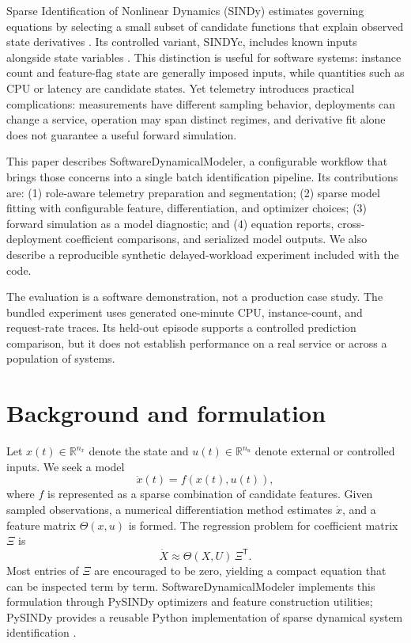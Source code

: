 \documentclass[11pt]{article}
\begin{document}
Sparse Identification of Nonlinear Dynamics (SINDy) estimates governing equations by selecting a small subset of candidate functions that explain observed state derivatives \cite{brunton2016sindy}. Its controlled variant, SINDYc, includes known inputs alongside state variables \cite{brunton2016sindyc}. This distinction is useful for software systems: instance count and feature-flag state are generally imposed inputs, while quantities such as CPU or latency are candidate states. Yet telemetry introduces practical complications: measurements have different sampling behavior, deployments can change a service, operation may span distinct regimes, and derivative fit alone does not guarantee a useful forward simulation.

This paper describes SoftwareDynamicalModeler, a configurable workflow that brings those concerns into a single batch identification pipeline. Its contributions are: (1) role-aware telemetry preparation and segmentation; (2) sparse model fitting with configurable feature, differentiation, and optimizer choices; (3) forward simulation as a model diagnostic; and (4) equation reports, cross-deployment coefficient comparisons, and serialized model outputs. We also describe a reproducible synthetic delayed-workload experiment included with the code.

The evaluation is a software demonstration, not a production case study. The bundled experiment uses generated one-minute CPU, instance-count, and request-rate traces. Its held-out episode supports a controlled prediction comparison, but it does not establish performance on a real service or across a population of systems.

\section{Background and formulation}

Let $x(t)\in\mathbb{R}^{n_x}$ denote the state and $u(t)\in\mathbb{R}^{n_u}$ denote external or controlled inputs. We seek a model
\begin{equation}
  \dot{x}(t) = f(x(t),u(t)),
  \label{eq:controlled-ode}
\end{equation}
where $f$ is represented as a sparse combination of candidate features. Given sampled observations, a numerical differentiation method estimates $\dot{x}$, and a feature matrix $\Theta(x,u)$ is formed. The regression problem for coefficient matrix $\Xi$ is
\begin{equation}
  \dot{X} \approx \Theta(X,U)\,\Xi^{\mathsf T}.
  \label{eq:sparse-regression}
\end{equation}
Most entries of $\Xi$ are encouraged to be zero, yielding a compact equation that can be inspected term by term. SoftwareDynamicalModeler implements this formulation through PySINDy optimizers and feature construction utilities; PySINDy provides a reusable Python implementation of sparse dynamical system identification \cite{desilva2020pysindy}.
\end{document}
